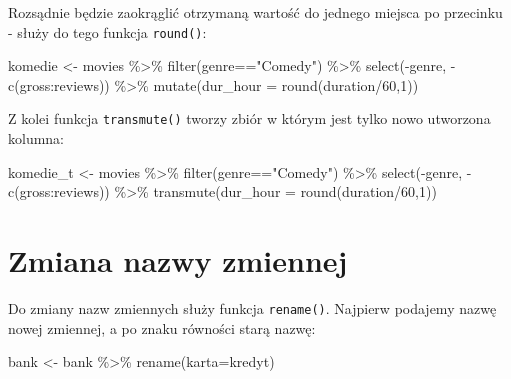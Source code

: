 \documentclass[
]{book}
\newenvironment{Shaded}{\begin{snugshade}}{\end{snugshade}}
\newcommand{\AttributeTok}[1]{\textcolor[rgb]{0.77,0.63,0.00}{#1}}
\newcommand{\DecValTok}[1]{\textcolor[rgb]{0.00,0.00,0.81}{#1}}
\newcommand{\FunctionTok}[1]{\textcolor[rgb]{0.00,0.00,0.00}{#1}}
\newcommand{\NormalTok}[1]{#1}
\newcommand{\OtherTok}[1]{\textcolor[rgb]{0.56,0.35,0.01}{#1}}
\newcommand{\SpecialCharTok}[1]{\textcolor[rgb]{0.00,0.00,0.00}{#1}}
\newcommand{\StringTok}[1]{\textcolor[rgb]{0.31,0.60,0.02}{#1}}
\begin{document}
Rozsądnie będzie zaokrąglić otrzymaną wartość do jednego miejsca po przecinku - służy do tego funkcja \texttt{round()}:

\begin{Shaded}
\begin{Highlighting}[]
\NormalTok{komedie }\OtherTok{\textless{}{-}}\NormalTok{ movies }\SpecialCharTok{\%\textgreater{}\%}
  \FunctionTok{filter}\NormalTok{(genre}\SpecialCharTok{==}\StringTok{"Comedy"}\NormalTok{) }\SpecialCharTok{\%\textgreater{}\%}
  \FunctionTok{select}\NormalTok{(}\SpecialCharTok{{-}}\NormalTok{genre, }\SpecialCharTok{{-}}\FunctionTok{c}\NormalTok{(gross}\SpecialCharTok{:}\NormalTok{reviews)) }\SpecialCharTok{\%\textgreater{}\%}
  \FunctionTok{mutate}\NormalTok{(}\AttributeTok{dur\_hour =} \FunctionTok{round}\NormalTok{(duration}\SpecialCharTok{/}\DecValTok{60}\NormalTok{,}\DecValTok{1}\NormalTok{))}
\end{Highlighting}
\end{Shaded}

Z kolei funkcja \texttt{transmute()} tworzy zbiór w którym jest tylko nowo utworzona kolumna:

\begin{Shaded}
\begin{Highlighting}[]
\NormalTok{komedie\_t }\OtherTok{\textless{}{-}}\NormalTok{ movies }\SpecialCharTok{\%\textgreater{}\%}
  \FunctionTok{filter}\NormalTok{(genre}\SpecialCharTok{==}\StringTok{"Comedy"}\NormalTok{) }\SpecialCharTok{\%\textgreater{}\%}
  \FunctionTok{select}\NormalTok{(}\SpecialCharTok{{-}}\NormalTok{genre, }\SpecialCharTok{{-}}\FunctionTok{c}\NormalTok{(gross}\SpecialCharTok{:}\NormalTok{reviews)) }\SpecialCharTok{\%\textgreater{}\%}
  \FunctionTok{transmute}\NormalTok{(}\AttributeTok{dur\_hour =} \FunctionTok{round}\NormalTok{(duration}\SpecialCharTok{/}\DecValTok{60}\NormalTok{,}\DecValTok{1}\NormalTok{))}
\end{Highlighting}
\end{Shaded}

\hypertarget{zmiana-nazwy-zmiennej}{%
\section{Zmiana nazwy zmiennej}\label{zmiana-nazwy-zmiennej}}

Do zmiany nazw zmiennych służy funkcja \texttt{rename()}. Najpierw podajemy nazwę nowej zmiennej, a po znaku równości starą nazwę:

\begin{Shaded}
\begin{Highlighting}[]
\NormalTok{bank }\OtherTok{\textless{}{-}}\NormalTok{ bank }\SpecialCharTok{\%\textgreater{}\%}
  \FunctionTok{rename}\NormalTok{(}\AttributeTok{karta=}\NormalTok{kredyt)}
\end{Highlighting}
\end{Shaded}
\end{document}
